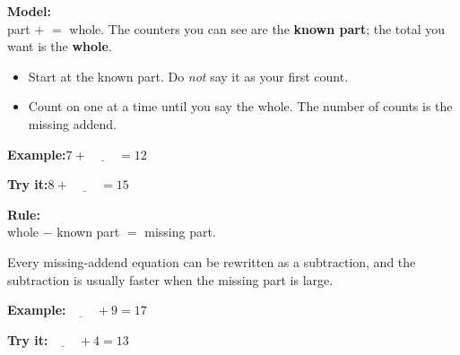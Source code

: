 \documentclass[12pt]{article}
\begin{document}

\begin{formulabox}\textbf{Model:}\\[4pt]
part $+$  $=$ whole. The counters you can see are the \textbf{known part};
the total you want is the \textbf{whole}.\par
\begin{itemize}[leftmargin=1cm, itemsep=1pt, topsep=2pt]
  \item Start at the known part. Do \emph{not} say it as your first count.
  \item Count on one at a time until you say the whole. The number of counts is the missing addend.
\end{itemize}
\end{formulabox}
\begin{examplebox}\textbf{Example:}\quad $7 + \underline{\hspace{1cm}} = 12$
\end{examplebox}
\begin{tryitbox}\textbf{Try it:}\quad $8 + \underline{\hspace{1cm}} = 15$\\[2pt]
\end{tryitbox}

\begin{formulabox}\textbf{Rule:}\\[4pt]
whole $-$ known part $=$ missing part.\par
Every missing-addend equation can be rewritten as a subtraction, and the subtraction
is usually faster when the missing part is large.
\end{formulabox}
\begin{examplebox}\textbf{Example:}\quad $\underline{\hspace{1cm}} + 9 = 17$
\end{examplebox}
\begin{tryitbox}\textbf{Try it:}\quad $\underline{\hspace{1cm}} + 4 = 13$\\[2pt]
\end{tryitbox}
\end{document}
